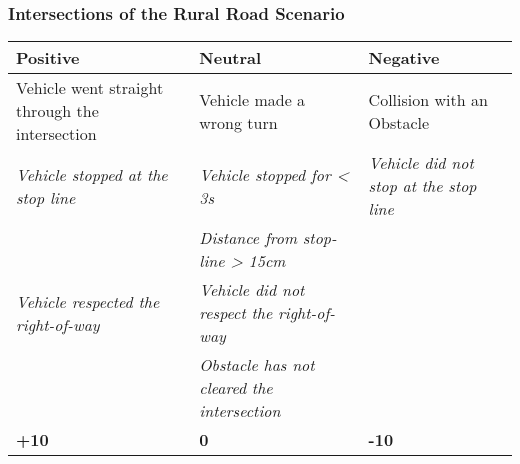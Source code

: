{\subsubsection*{Intersections of the Rural Road Scenario}
\begin{table}[H]
    \begin{tabularx}{\textwidth}{XXX}
        \toprule
        \textbf{Positive}                                           & \textbf{Neutral}                                                   & \textbf{Negative}                                              \\
        \midrule
        Vehicle went straight through the intersection              & Vehicle made a wrong turn                                          & Collision with an Obstacle                                     \\
        \textit{Vehicle stopped at the stop line}\footnotemark[1]   & \textit{Vehicle stopped for < 3s}\footnotemark[1]                  & \textit{Vehicle did not stop at the stop line}\footnotemark[1] \\
                                                                    & \textit{Distance from stop-line > 15cm}\footnotemark[1]            &                                                                \\
        \textit{Vehicle respected the right-of-way}\footnotemark[2] & \textit{Vehicle did not respect the right-of-way}\footnotemark[2]  &                                                                \\
                                                                    & \textit{Obstacle has not cleared the intersection}\footnotemark[2] &                                                                \\
        \topstrut
        \textbf{+10}                                                & \textbf{0}                                                         & \textbf{-10}                                                   \\
        \bottomrule
    \end{tabularx}
\end{table}

}
